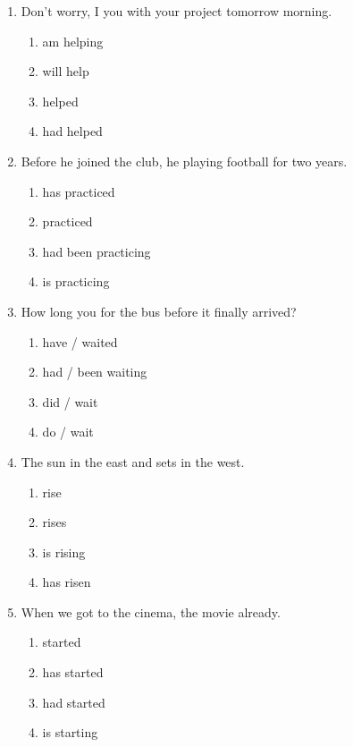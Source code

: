 \documentclass[11pt, a4paper]{article}
\begin{document}
\begin{enumerate}[leftmargin=1.8em, itemsep=10pt]
    \item Don't worry, I \dotfill you with your project tomorrow morning.
    \begin{enumerate}[label=(\Alph*), itemsep=2pt]
        \item am helping
        \item will help
        \item helped
        \item had helped
    \end{enumerate}

    \item Before he joined the club, he \dotfill playing football for two years.
    \begin{enumerate}[label=(\Alph*), itemsep=2pt]
        \item has practiced
        \item practiced
        \item had been practicing
        \item is practicing
    \end{enumerate}

    \item How long \dotfill you \dotfill for the bus before it finally arrived?
    \begin{enumerate}[label=(\Alph*), itemsep=2pt]
        \item have / waited
        \item had / been waiting
        \item did / wait
        \item do / wait
    \end{enumerate}

    \item The sun \dotfill in the east and sets in the west.
    \begin{enumerate}[label=(\Alph*), itemsep=2pt]
        \item rise
        \item rises
        \item is rising
        \item has risen
    \end{enumerate}

    \item When we got to the cinema, the movie \dotfill already.
    \begin{enumerate}[label=(\Alph*), itemsep=2pt]
        \item started
        \item has started
        \item had started
        \item is starting
    \end{enumerate}


\end{enumerate}
\end{document}
